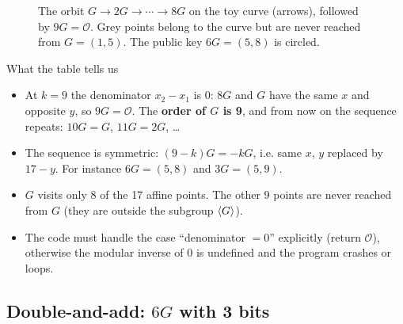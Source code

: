 \begin{figure}[H]
  \centering
  \caption{The orbit $G \to 2G \to \cdots \to 8G$ on the toy curve (arrows), followed by $9G = \mathcal{O}$. Grey points belong to the curve but are never reached from $G = (1,5)$. The public key $6G = (5,8)$ is circled.}
  \label{fig:toy-path}
\end{figure}

\begin{framedobs}{What the table tells us}
  \begin{itemize}
    \item At $k = 9$ the denominator $x_2 - x_1$ is $0$: $8G$ and $G$ have the same $x$ and opposite $y$, so $9G = \mathcal{O}$. The \textbf{order of $G$ is 9}, and from now on the sequence repeats: $10G = G$, $11G = 2G$, \ldots
    \item The sequence is symmetric: $(9 - k) G = -kG$, i.e. same $x$, $y$ replaced by $17 - y$. For instance $6G = (5,8)$ and $3G = (5,9)$.
    \item $G$ visits only 8 of the 17 affine points. The other 9 points are never reached from $G$ (they are outside the subgroup $\left\langle G \right\rangle$).
    \item The code must handle the case ``denominator $= 0$'' explicitly (return $\mathcal{O}$), otherwise the modular inverse of 0 is undefined and the program crashes or loops.
  \end{itemize}
\end{framedobs}

\subsection{Double-and-add: $6G$ with 3 bits}

